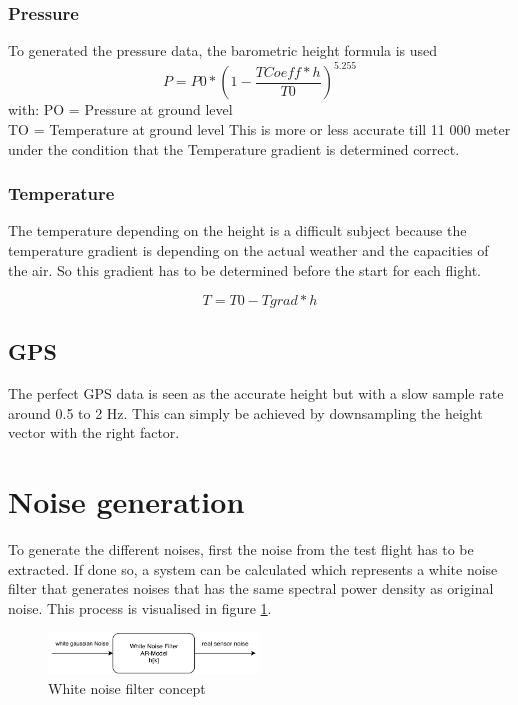   \subsubsection{Pressure}
  To generated the pressure data, the barometric height formula is used %
  $$P = P0 * (1- \frac{TCoeff*h}{T0})^{5.255}$$
  with: PO = Pressure at ground level \\
	TO = Temperature at ground level
  This is more or less accurate till 11 000 meter under the condition that the Temperature gradient is determined correct. 

  \subsubsection{Temperature}
  The temperature depending on the height is a difficult subject because the temperature gradient is depending on the actual weather and the capacities of the air.
  So this gradient has to be determined before the start for each flight.

  $$T = T0 - Tgrad*h$$
  
  \subsection{GPS}
  The perfect GPS data is seen as the accurate height but with a slow sample rate around 0.5 to 2 Hz.
  This can simply be achieved by downsampling the height vector with the right factor.
  
  
  \section{Noise generation}
  To generate the different noises, first the noise from the test flight has to be extracted.
  If done so, a system can be calculated which represents a white noise filter that generates noises
  that has the same spectral power density as original noise. This process is visualised in figure \ref{fig:WhiteNoiseFilter}.
  
  \begin{figure}
 \centering
 \includegraphics[width=0.5\textwidth]{./Pictures/WhiteNoiseFilter.pdf}
 \caption{White noise filter concept}
 \label{fig:WhiteNoiseFilter}
\end{figure}
  
